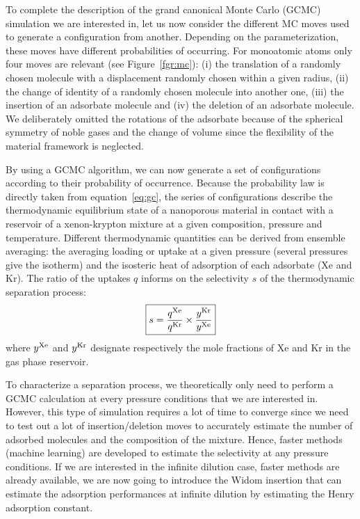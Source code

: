 \documentclass[main.tex]{subfiles}
\begin{document}
To complete the description of the grand canonical Monte Carlo (GCMC) simulation we are interested in, let us now consider the different MC moves used to generate a configuration from another. Depending on the parameterization, these moves have different probabilities of occurring. For monoatomic atoms only four moves are relevant (see Figure~\ref{fgr:mc}): (i) the translation of a randomly chosen molecule with a displacement randomly chosen within a given radius, (ii) the change of identity of a randomly chosen molecule into another one, (iii) the insertion of an adsorbate molecule and (iv) the deletion of an adsorbate molecule. We deliberately omitted the rotations of the adsorbate because of the spherical symmetry of noble gases and the change of volume since the flexibility of the material framework is neglected. 

By using a GCMC algorithm, we can now generate a set of configurations according to their probability of occurrence. Because the probability law is directly taken from equation~\ref{eq:gc}, the series of configurations describe the thermodynamic equilibrium state of a nanoporous material in contact with a reservoir of a xenon-krypton mixture at a given composition, pressure and temperature. Different thermodynamic quantities can be derived from ensemble averaging: the averaging loading or uptake at a given pressure (several pressures give the isotherm) and the isosteric heat of adsorption of each adsorbate (Xe and Kr). The ratio of the uptakes $q$ informs on the selectivity $s$ of the thermodynamic separation process: 
\begin{equation}\label{eq:selec}
  \boxed{
  s = \dfrac{q^{\text{Xe}}}{q^{\text{Kr}}}\times\dfrac{y^{\text{Kr}}}{y^{\text{Xe}}}
  }
\end{equation}
where $y^{\text{Xe}}$ and $y^{\text{Kr}}$ designate respectively the mole fractions of Xe and Kr in the gas phase reservoir.

To characterize a separation process, we theoretically only need to perform a GCMC calculation at every pressure conditions that we are interested in. However, this type of simulation requires a lot of time to converge since we need to test out a lot of insertion/deletion moves to accurately estimate the number of adsorbed molecules and the composition of the mixture. Hence, faster methods (machine learning) are developed to estimate the selectivity at any pressure conditions.\autocite{Simon_2015,Kang_2023} If we are interested in the infinite dilution case, faster methods are already available, we are now going to introduce the Widom insertion that can estimate the adsorption performances at infinite dilution by estimating the Henry adsorption constant.
\end{document}
